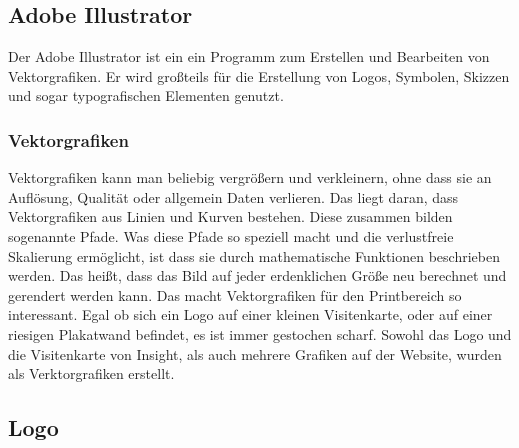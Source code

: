 \subsection{Adobe Illustrator}
Der Adobe Illustrator ist ein ein Programm zum Erstellen und Bearbeiten von Vektorgrafiken. Er wird großteils für die Erstellung von Logos, Symbolen, Skizzen und sogar typografischen Elementen genutzt.\cite{illustrator}
\subsubsection{Vektorgrafiken}
Vektorgrafiken kann man beliebig vergrößern und verkleinern, ohne dass sie an Auflösung, Qualität oder allgemein Daten verlieren. Das liegt daran, dass Vektorgrafiken aus Linien und Kurven bestehen. Diese zusammen bilden sogenannte Pfade. Was diese Pfade so speziell macht und die verlustfreie Skalierung ermöglicht, ist dass sie durch mathematische Funktionen beschrieben werden. Das heißt, dass das Bild auf jeder erdenklichen Größe neu berechnet und gerendert werden kann. Das macht Vektorgrafiken für den Printbereich so interessant. Egal ob sich ein Logo auf einer kleinen Visitenkarte, oder auf einer riesigen Plakatwand befindet, es ist immer gestochen scharf. Sowohl das Logo und die Visitenkarte von Insight, als auch mehrere Grafiken auf der Website, wurden als Verktorgrafiken erstellt.
\cite{vektor}\cite{vektorzwei}

\subsection{Logo}
